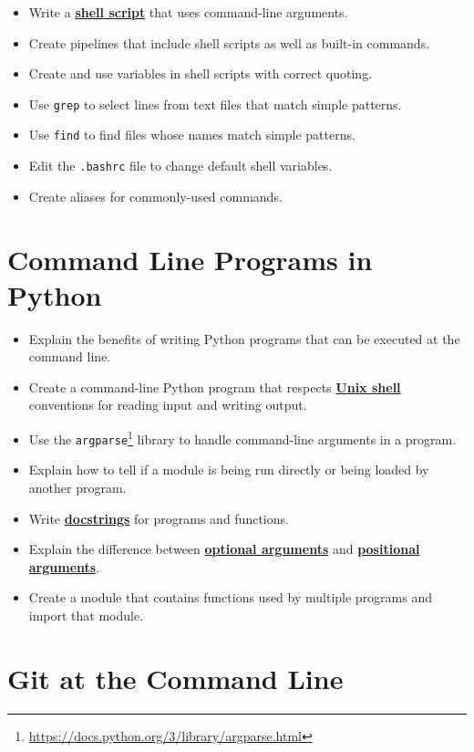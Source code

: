 \documentclass[
]{krantz}
\providecommand{\tightlist}{%
  \setlength{\itemsep}{0pt}\setlength{\parskip}{0pt}}
\renewcommand{\href}[2]{#2\footnote{\url{#1}}}
\newcommand{\gref}[2]{\hyperlink{#2}{\textbf{#1}}}
\begin{document}
\begin{itemize}
\tightlist
\item
  Write a \gref{shell script}{shell\_script} that uses command-line arguments.
\item
  Create pipelines that include shell scripts as well as built-in commands.
\item
  Create and use variables in shell scripts with correct quoting.
\item
  Use \texttt{grep} to select lines from text files that match simple patterns.
\item
  Use \texttt{find} to find files whose names match simple patterns.
\item
  Edit the \texttt{.bashrc} file to change default shell variables.
\item
  Create aliases for commonly-used commands.
\end{itemize}

\hypertarget{command-line-programs-in-python}{%
\section{Command Line Programs in Python}\label{command-line-programs-in-python}}

\begin{itemize}
\tightlist
\item
  Explain the benefits of writing Python programs that can be executed at the command line.
\item
  Create a command-line Python program that respects \gref{Unix shell}{shell} conventions for reading input and writing output.
\item
  Use the \href{https://docs.python.org/3/library/argparse.html}{\texttt{argparse}} library to handle command-line arguments in a program.
\item
  Explain how to tell if a module is being run directly or being loaded by another program.
\item
  Write \gref{docstrings}{docstring} for programs and functions.
\item
  Explain the difference between \gref{optional arguments}{optional\_argument} and \gref{positional arguments}{positional\_argument}.
\item
  Create a module that contains functions used by multiple programs and import that module.
\end{itemize}

\hypertarget{git-at-the-command-line}{%
\section{Git at the Command Line}\label{git-at-the-command-line}}
\end{document}
